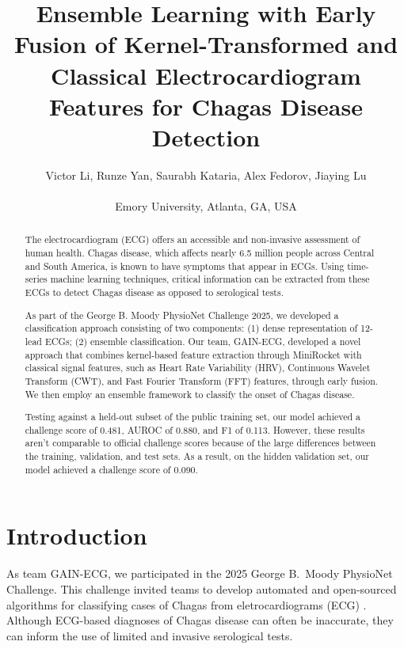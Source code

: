 \documentclass[twocolumn]{cinc}
\title{Ensemble Learning with Early Fusion of Kernel-Transformed and Classical Electrocardiogram Features for Chagas Disease Detection}
\author{Victor Li,
Runze Yan,
Saurabh Kataria,
Alex Fedorov,
Jiaying Lu \\ \ \\
Emory University, Atlanta, GA, USA \\}
\begin{document}
\maketitle



\begin{abstract}
The electrocardiogram (ECG) offers an accessible and non-invasive assessment of human health. Chagas disease, which affects nearly 6.5 million people across Central and South America, is known to have symptoms that appear in ECGs. Using time-series machine learning techniques, critical information can be extracted from these ECGs to detect Chagas disease as opposed to serological tests.

As part of the George B. Moody PhysioNet Challenge 2025, we developed a classification approach consisting of two components: (1) dense representation of 12-lead ECGs; (2) ensemble classification. Our team, GAIN-ECG, developed a novel approach that combines kernel-based feature extraction through MiniRocket with classical signal features, such as Heart Rate Variability (HRV), Continuous Wavelet Transform (CWT), and Fast Fourier Transform (FFT) features, through early fusion. We then employ an ensemble framework to classify the onset of Chagas disease.

Testing against a held-out subset of the public training set, our model achieved a challenge score of 0.481, AUROC of 0.880, and F1 of 0.113. However, these results aren't comparable to official challenge scores because of the large differences between the training, validation, and test sets. As a result, on the hidden validation set, our model achieved a challenge score of 0.090.

\end{abstract}


\section{Introduction}
As team GAIN-ECG, we participated in the 2025 George B.\ Moody PhysioNet Challenge. This challenge invited teams to develop automated and open-sourced algorithms for classifying cases of Chagas from eletrocardiograms (ECG) \cite{Goldberger2000, 2025Challenge}. Although ECG-based diagnoses of Chagas disease can often be inaccurate, they can inform the use of limited and invasive serological tests. 
\end{document}
